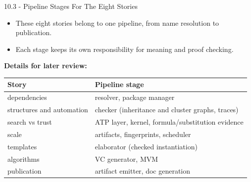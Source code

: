 \documentclass[aspectratio=169,11pt]{beamer}
\begin{document}
\begin{frame}[fragile,t]{10.3 - Pipeline Stages For The Eight Stories}
\begin{itemize}
\setlength{\itemsep}{1pt}
\setlength{\parsep}{0pt}
\setlength{\parskip}{0pt}
\item These eight stories belong to one pipeline, from name resolution to publication.
\item Each stage keeps its own responsibility for meaning and proof checking.
\end{itemize}
\smallskip
\textbf{Details for later review:}
\begin{footnotesize}
\setlength{\tabcolsep}{3pt}
\renewcommand{\arraystretch}{1.15}
\begin{tabularx}{\textwidth}{>{\raggedright\arraybackslash}X>{\raggedright\arraybackslash}X}
\toprule
\textbf{Story} & \textbf{Pipeline stage} \\
\midrule
dependencies & resolver, package manager \\
structures and automation & checker (inheritance and cluster graphs, traces) \\
search vs trust & ATP layer, kernel, formula/substitution evidence \\
scale & artifacts, fingerprints, scheduler \\
templates & elaborator (checked instantiation) \\
algorithms & VC generator, MVM \\
publication & artifact emitter, doc generation \\
\bottomrule
\end{tabularx}
\end{footnotesize}

\end{frame}
\end{document}
